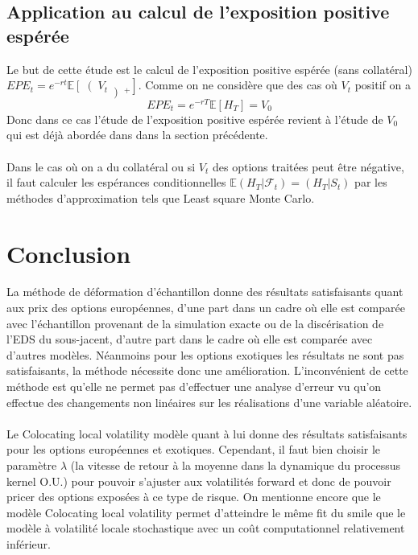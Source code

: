 \documentclass[a4paper,12pt]{report}
\numberwithin{equation}{section}
\theoremstyle{definition}
\numberwithin{equation}{section}
\begin{document}
\section{Application au calcul de l'exposition positive espérée}
Le but de cette étude est le calcul de l'exposition positive espérée (sans collatéral) $EPE_t = e^{-r t}\mathbb{E}\left[ \right( V_t\left)_+ \right]$. Comme on ne considère que des cas où  $V_t$ positif on a  
 $$EPE_t = e^{-r T}\mathbb{E}\left[H_T \right] = V_0$$
Donc dans ce cas l'étude de l'exposition positive espérée revient à l'étude de $V_0$ qui est déjà abordée dans dans la section précédente. \\\\
Dans le cas où on a du collatéral ou si $V_t$ des options traitées peut être négative, il faut calculer les espérances conditionnelles $\mathbb{E}\left( H_T | \mathcal{F}_t \right) =\left( H_T |S_t\right)$ par les méthodes d'approximation tels que Least square Monte Carlo.

\chapter{Conclusion}
La méthode de déformation d'échantillon donne des résultats satisfaisants quant aux prix des options européennes, d'une part dans un cadre où elle est comparée avec l'échantillon provenant de la simulation exacte ou de la discérisation de l'EDS du sous-jacent, d'autre part dans le cadre où elle est comparée avec d'autres modèles. Néanmoins pour les options exotiques les résultats ne sont pas satisfaisants, la méthode nécessite donc une amélioration. L'inconvénient de cette méthode est qu'elle ne permet pas d'effectuer une analyse d'erreur vu qu'on effectue des changements non linéaires sur les réalisations d'une variable aléatoire.\\\\
Le Colocating local volatility modèle quant à lui donne des résultats satisfaisants pour les options européennes et exotiques. Cependant, il faut bien choisir le paramètre $\lambda$ (la vitesse de retour à la moyenne dans la dynamique du processus kernel O.U.) pour pouvoir s'ajuster aux volatilités forward et donc de pouvoir pricer des options exposées à ce type de risque. On mentionne encore que le modèle Colocating local volatility permet d'atteindre le même fit du smile que le modèle à volatilité locale stochastique avec un coût computationnel relativement inférieur.  \\\\




\end{document}
